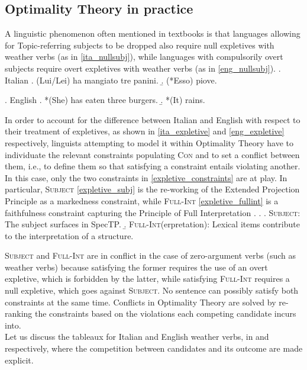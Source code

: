 \subsection{Optimality Theory in practice} A linguistic phenomenon often mentioned in textbooks is that languages allowing for Topic-referring subjects to be dropped also require null expletives with weather verbs (as in \ref{ita_nullsubj}), while languages with compulsorily overt subjects require overt expletives with weather verbs (as in \ref{eng_nullsubj}).
\ex. \label{ita_nullsubj} Italian
\a. (Lui/Lei) ha mangiato tre panini.
\b. \label{ita_expletive} (*Esso) piove.

\ex. \label{eng_nullsubj} English
\a. *(She) has eaten three burgers.
\b. \label{eng_expletive} *(It) rains.

In order to account for the difference between Italian and English with respect to their treatment of expletives, as shown in \ref{ita_expletive} and \ref{eng_expletive} respectively, linguists attempting to model it within Optimality Theory have to individuate the relevant constraints populating \textsc{Con} and to set a conflict between them, i.e., to define them so that satisfying a constraint entails violating another.\\
In this case, only the two constraints in \ref{expletive_constraints} are at play. In particular, \textsc{Subject} \ref{expletive_subj} is the re-working of the Extended Projection Principle \parencite{chomsky1982epp} as a markedness constraint, while \textsc{Full-Int} \ref{expletive_fullint} is a faithfulness constraint capturing the Principle of Full Interpretation \parencite{chomsky1991fullint}.
\ex. \label{expletive_constraints} \a. \label{expletive_subj} \textsc{Subject}: The subject surfaces in SpecTP.
\b. \label{expletive_fullint} \textsc{Full-Int}(erpretation): Lexical items contribute to the interpretation of a structure.

\textsc{Subject} and \textsc{Full-Int} are in conflict in the case of zero-argument verbs (such as weather verbs) because satisfying the former requires the use of an overt expletive, which is forbidden by the latter, while satisfying \textsc{Full-Int} requires a null expletive, which goes against \textsc{Subject}. No sentence can possibly satisfy both constraints at the same time. Conflicts in Optimality Theory are solved by re-ranking the constraints based on the violations each competing candidate incurs into.\\
Let us discuss the tableaux for Italian and English weather verbs, in  and  respectively, where the competition between candidates and its outcome are made explicit.

